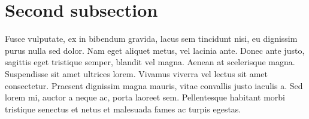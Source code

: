 \section{Second subsection}
Fusce vulputate, ex in bibendum gravida, lacus sem tincidunt nisi, eu dignissim purus nulla sed dolor. Nam eget aliquet metus, vel lacinia ante. Donec ante justo, sagittis eget tristique semper, blandit vel magna. Aenean at scelerisque magna. Suspendisse sit amet ultrices lorem. Vivamus viverra vel lectus sit amet consectetur. Praesent dignissim magna mauris, vitae convallis justo iaculis a. Sed lorem mi, auctor a neque ac, porta laoreet sem. Pellentesque habitant morbi tristique senectus et netus et malesuada fames ac turpis egestas.